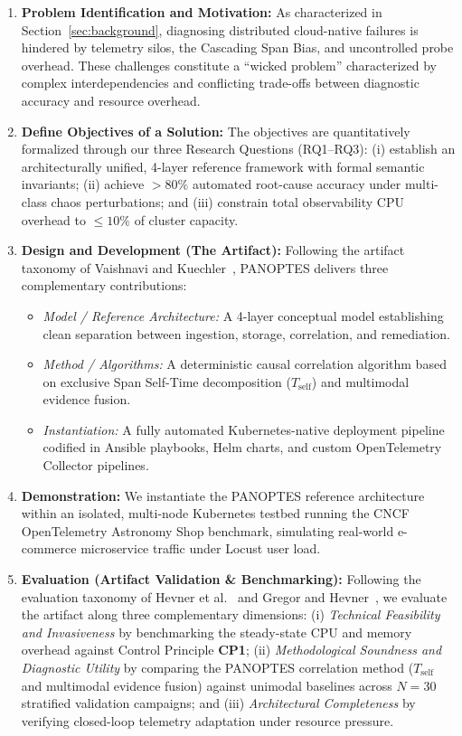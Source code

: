 \begin{enumerate}[leftmargin=1.2em, itemsep=3pt, topsep=4pt]
    \item \textbf{Problem Identification and Motivation:} As characterized in Section~\ref{sec:background}, diagnosing distributed cloud-native failures is hindered by telemetry silos, the Cascading Span Bias, and uncontrolled probe overhead. These challenges constitute a ``wicked problem'' characterized by complex interdependencies and conflicting trade-offs between diagnostic accuracy and resource overhead.
    \item \textbf{Define Objectives of a Solution:} The objectives are quantitatively formalized through our three Research Questions (RQ1--RQ3): (i) establish an architecturally unified, 4-layer reference framework with formal semantic invariants; (ii) achieve $>80\%$ automated root-cause accuracy under multi-class chaos perturbations; and (iii) constrain total observability CPU overhead to $\le 10\%$ of cluster capacity.
    \item \textbf{Design and Development (The Artifact):} Following the artifact taxonomy of Vaishnavi and Kuechler~\cite{vaishnavi_2015}, PANOPTES delivers three complementary contributions:
    \begin{itemize}[leftmargin=1.0em, itemsep=1pt]
        \item \textit{Model / Reference Architecture:} A 4-layer conceptual model establishing clean separation between ingestion, storage, correlation, and remediation.
        \item \textit{Method / Algorithms:} A deterministic causal correlation algorithm based on exclusive Span Self-Time decomposition ($T_{\text{self}}$) and multimodal evidence fusion.
        \item \textit{Instantiation:} A fully automated Kubernetes-native deployment pipeline codified in Ansible playbooks, Helm charts, and custom OpenTelemetry Collector pipelines.
    \end{itemize}
    \item \textbf{Demonstration:} We instantiate the PANOPTES reference architecture within an isolated, multi-node Kubernetes testbed running the CNCF OpenTelemetry Astronomy Shop benchmark, simulating real-world e-commerce microservice traffic under Locust user load.
    \item \textbf{Evaluation (Artifact Validation \& Benchmarking):} Following the evaluation taxonomy of Hevner et al.~\cite{hevner_2004} and Gregor and Hevner~\cite{gregor_2013}, we evaluate the artifact along three complementary dimensions: (i) \textit{Technical Feasibility and Invasiveness} by benchmarking the steady-state CPU and memory overhead against Control Principle \textbf{CP1}; (ii) \textit{Methodological Soundness and Diagnostic Utility} by comparing the PANOPTES correlation method ($T_{\text{self}}$ and multimodal evidence fusion) against unimodal baselines across $N=30$ stratified validation campaigns; and (iii) \textit{Architectural Completeness} by verifying closed-loop telemetry adaptation under resource pressure.

\end{enumerate}
